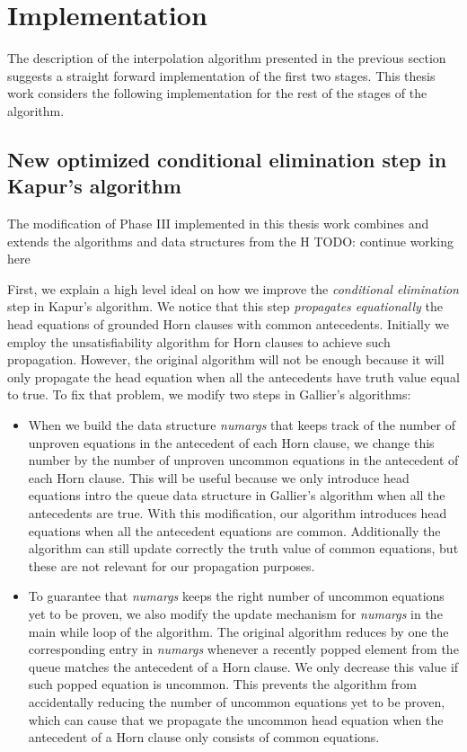 \section{Implementation}

The description of the interpolation algorithm presented in the
previous section suggests a straight forward implementation
of the first two stages. This thesis work considers the following
implementation for the rest of the stages of the algorithm.

\subsection{New optimized conditional elimination step in Kapur's algorithm}

The modification of Phase III implemented in this thesis work
combines and extends the algorithms and data structures from 
the H TODO: continue working here

First, we explain a high level ideal on how 
we improve the \emph{conditional elimination}
step in Kapur's algorithm. We notice that this 
step \emph{propagates equationally} the
head equations of grounded Horn clauses with 
common antecedents. Initially we employ the
unsatisfiability algorithm for Horn clauses 
to achieve such propagation. However, the original
algorithm will not be enough because it will 
only propagate the head equation when all the
antecedents have truth value equal to 
true. To fix that problem, we modify two steps in Gallier's
algorithms:

\begin{itemize}
  \item When we build the data structure \emph{numargs} that keeps 
    track of the number of unproven
    equations in the antecedent of each Horn clause, we change 
    this number by the number
    of unproven uncommon equations in the antecedent of each 
    Horn clause. This will be useful
    because we only introduce head equations intro the queue 
    data structure in Gallier's algorithm
    when all the antecedents are true. With this 
    modification, our algorithm introduces head equations
    when all the antecedent equations are common. 
    Additionally the algorithm can still update
    correctly the truth value of common equations, 
    but these are not relevant for our propagation
    purposes.
  \item To guarantee that \emph{numargs} keeps the 
    right number of uncommon equations yet to
    be proven, we also modify the update mechanism for 
    \emph{numargs} in the main while loop of the algorithm.
    The original algorithm reduces by one the 
    corresponding entry in \emph{numargs}
    whenever a recently popped element from the queue 
    matches the antecedent of a Horn clause. We only
    decrease this value if such popped equation is uncommon. 
    This prevents the algorithm from accidentally
    reducing the number of uncommon equations yet to be proven, 
    which can cause that we propagate the
    uncommon head equation when the antecedent of a Horn 
    clause only consists of common equations.
\end{itemize}

